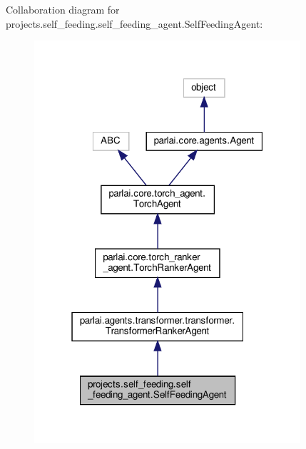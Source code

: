 Collaboration diagram for projects.\+self\+\_\+feeding.\+self\+\_\+feeding\+\_\+agent.\+Self\+Feeding\+Agent\+:
\nopagebreak
\begin{figure}[H]
\begin{center}
\leavevmode
\includegraphics[width=280pt]{de/d2d/classprojects_1_1self__feeding_1_1self__feeding__agent_1_1SelfFeedingAgent__coll__graph}
\end{center}
\end{figure}
